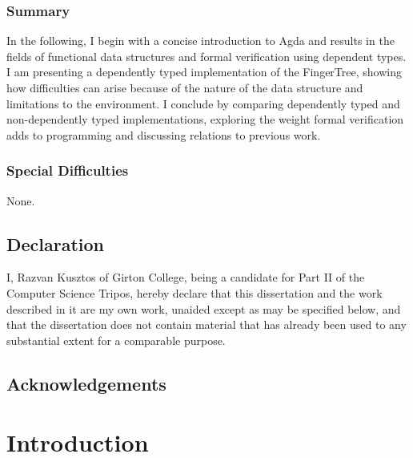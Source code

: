 \documentclass[12pt,twoside,notitlepage]{report}
\begin{document}
\subsection*{Summary}
In the following, I begin with a concise introduction to Agda and results in the fields of functional data structures and 
formal verification using dependent types. I am presenting a dependently typed implementation of the FingerTree, showing how difficulties can arise because of the nature of the data structure and limitations to the environment. I conclude by comparing dependently typed and non-dependently typed implementations, exploring the weight formal verification adds to programming and discussing relations to previous work.    

\subsection*{Special Difficulties}
None.

\newpage
\section*{Declaration}

I, Razvan Kusztos of Girton College, being a candidate for Part II of the Computer
Science Tripos, hereby declare
that this dissertation and the work described in it are my own work,
unaided except as may be specified below, and that the dissertation
does not contain material that has already been used to any substantial
extent for a comparable purpose.

\bigskip
{}

\medskip
{}

\cleardoublepage

\tableofcontents

\listoffigures

\newpage
\section*{Acknowledgements}


\cleardoublepage        %

\setcounter{page}{1}
\pagestyle{headings}


\chapter{Introduction}
\end{document}
